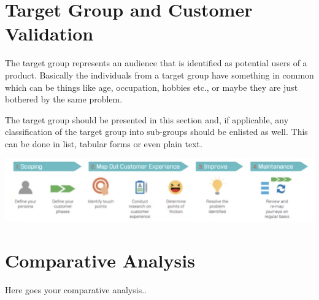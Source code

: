 \section{Target Group and Customer Validation}

The target group represents an audience that is identified as potential users of a product. 
Basically the individuals from a target group have something in common which can be things like age, occupation, hobbies etc., or maybe they are just bothered by the same problem.

The target group should be presented in this section and, if applicable, any classification of the target group into sub-groups should be enlisted as well. 
This can be done in list, tabular forms or even plain text.

{ \centering \includegraphics[width=\textwidth]{images/problem_analysis.png} }


\section{Comparative Analysis}

Here goes your comparative analysis..


